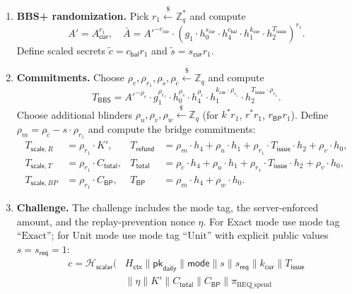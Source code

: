 \documentclass[11pt]{article}
\theoremstyle{definitionstyle}
\theoremstyle{plain}
\begin{document}
\begin{enumerate}[leftmargin=*]
\item \textbf{BBS+ randomization.}
  Pick $r_1 \xleftarrow{\$} \mathbb{Z}_q^*$ and compute
  \[
  A' = A_{\mathsf{cur}}^{r_1}, \quad
  \bar{A} = A'^{-e_{\mathsf{cur}}} \cdot \left( g_1 \cdot h_0^{s_{\mathsf{cur}}} \cdot h_4^{c_{\mathsf{bal}}} \cdot h_1^{k_{\mathsf{cur}}} \cdot h_2^{T_{\mathsf{issue}}} \right)^{r_1}.
  \]
  Define scaled secrets $\tilde{c} = c_{\mathsf{bal}} r_1$ and $\tilde{s} = s_{\mathsf{cur}} r_1$.
\item \textbf{Commitments.}
  Choose $\rho_e, \rho_{r_1}, \rho_{\tilde{s}}, \rho_{\tilde{c}} \xleftarrow{\$} \mathbb{Z}_q$ and compute
  \[
  T_{\mathsf{BBS}} = A'^{-\rho_e} \cdot g_1^{\rho_{r_1}} \cdot h_0^{\rho_{\tilde{s}}} \cdot h_4^{\rho_{\tilde{c}}} \cdot h_1^{k_{\mathsf{cur}} \cdot \rho_{r_1}} \cdot h_2^{T_{\mathsf{issue}} \cdot \rho_{r_1}}.
  \]
  Choose additional blinders $\rho_u, \rho_v, \rho_w \xleftarrow{\$} \mathbb{Z}_q$ (for $k^* r_1$, $r^* r_1$, $r_{\mathsf{BP}} r_1$). Define $\rho_m = \rho_{\tilde{c}} - s \cdot \rho_{r_1}$ and compute the bridge commitments:
  \begin{align*}
    T_{\mathsf{scale},R} &= \rho_{r_1} \cdot K', & T_{\mathsf{refund}} &= \rho_m \cdot h_4 + \rho_u \cdot h_1 + \rho_{r_1} \cdot T_{\mathsf{issue}} \cdot h_2 + \rho_v \cdot h_0, \\
    T_{\mathsf{scale},T} &= \rho_{r_1} \cdot C_{\mathsf{total}}, & T_{\mathsf{total}} &= \rho_{\tilde{c}} \cdot h_4 + \rho_u \cdot h_1 + \rho_{r_1} \cdot T_{\mathsf{issue}} \cdot h_2 + \rho_v \cdot h_0, \\
    T_{\mathsf{scale},BP} &= \rho_{r_1} \cdot C_{\mathsf{BP}}, & T_{\mathsf{BP}} &= \rho_m \cdot h_4 + \rho_w \cdot h_0.
  \end{align*}
\item \textbf{Challenge.}
  The challenge includes the mode tag, the server-enforced amount, and the replay-prevention nonce $\eta$. For Exact mode use mode tag $\text{``Exact''}$; for Unit mode use mode tag $\text{``Unit''}$ with explicit public values $s = s_{\mathsf{req}} = 1$:
  \[
  \begin{aligned}
  c = \mathcal{H}_{\mathsf{scalar}}\!\bigl(
    &H_{\mathsf{ctx}} \parallel \mathsf{pk}_{\mathsf{daily}} \parallel \mathsf{mode}
    \parallel s \parallel s_{\mathsf{req}} \parallel k_{\mathsf{cur}} \parallel T_{\mathsf{issue}} \\
    &\parallel \eta \parallel K' \parallel C_{\mathsf{total}} \parallel C_{\mathsf{BP}}
    \parallel \pi_{\text{BEQ\_spend}} \\

\end{aligned}\]
\end{enumerate}
\end{document}
